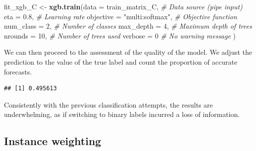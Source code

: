 \documentclass[]{krantz}
\makeatletter
\newenvironment{Shaded}{\begin{snugshade}}{\end{snugshade}}
\newcommand{\CommentTok}[1]{\textcolor[rgb]{0.37,0.37,0.37}{\textit{#1}}}
\newcommand{\DataTypeTok}[1]{\textcolor[rgb]{0.27,0.27,0.27}{#1}}
\newcommand{\DecValTok}[1]{\textcolor[rgb]{0.06,0.06,0.06}{#1}}
\newcommand{\FloatTok}[1]{\textcolor[rgb]{0.06,0.06,0.06}{#1}}
\newcommand{\KeywordTok}[1]{\textcolor[rgb]{0.27,0.27,0.27}{\textbf{#1}}}
\newcommand{\NormalTok}[1]{#1}
\newcommand{\OperatorTok}[1]{\textcolor[rgb]{0.43,0.43,0.43}{\textbf{#1}}}
\newcommand{\StringTok}[1]{\textcolor[rgb]{0.5,0.5,0.5}{#1}}
\newenvironment{kframe}{%
\medskip{}
\setlength{\fboxsep}{.8em}
 \def\at@end@of@kframe{}%
 \ifinner\ifhmode%
  \def\at@end@of@kframe{\end{minipage}}%
  \begin{minipage}{\columnwidth}%
 \fi\fi%
 \def\FrameCommand##1{\hskip\@totalleftmargin \hskip-\fboxsep
 \colorbox{shadecolor}{##1}\hskip-\fboxsep
     \hskip-\linewidth \hskip-\@totalleftmargin \hskip\columnwidth}%
 \MakeFramed {\advance\hsize-\width
   \@totalleftmargin\z@ \linewidth\hsize
   \@setminipage}}%
 {\par\unskip\endMakeFramed%
 \at@end@of@kframe}
\renewenvironment{Shaded}{\begin{kframe}}{\end{kframe}}
\theoremstyle{definition}
\theoremstyle{definition}
\theoremstyle{definition}
\theoremstyle{remark}
\makeatother
\begin{document}
\footnotesize

\begin{Shaded}
\begin{Highlighting}[]
\NormalTok{fit_xgb_C <-}\StringTok{  }\KeywordTok{xgb.train}\NormalTok{(}\DataTypeTok{data =}\NormalTok{ train_matrix_C,  }\CommentTok{# Data source (pipe input)}
              \DataTypeTok{eta =} \FloatTok{0.8}\NormalTok{,                        }\CommentTok{# Learning rate}
              \DataTypeTok{objective =} \StringTok{"multi:softmax"}\NormalTok{,      }\CommentTok{# Objective function}
              \DataTypeTok{num_class =} \DecValTok{2}\NormalTok{,                    }\CommentTok{# Number of classes}
              \DataTypeTok{max_depth =} \DecValTok{4}\NormalTok{,                    }\CommentTok{# Maximum depth of trees}
              \DataTypeTok{nrounds =} \DecValTok{10}\NormalTok{,                     }\CommentTok{# Number of trees used}
              \DataTypeTok{verbose =} \DecValTok{0}                       \CommentTok{# No warning message }
\NormalTok{    )}
\end{Highlighting}
\end{Shaded}

\normalsize

We can then proceed to the assessment of the quality of the model. We
adjust the prediction to the value of the true label and count the
proportion of accurate forecasts.

\footnotesize

\begin{Shaded}
\end{Shaded}

\begin{verbatim}
## [1] 0.495613
\end{verbatim}

\normalsize

Consistently with the previous classification attempts, the results are
underwhelming, as if switching to binary labels incurred a loss of
information.

\hypertarget{instweight}{%
\subsection{Instance weighting}\label{instweight}}
\end{document}
